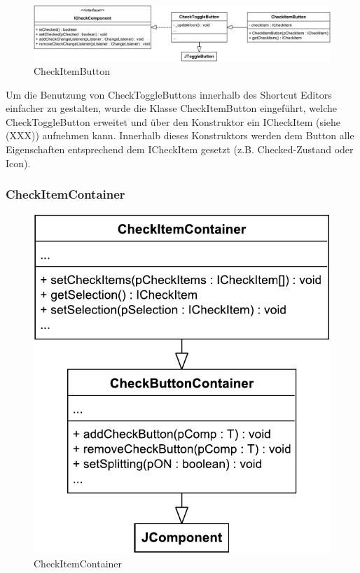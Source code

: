\begin{figure}[H]
	\centering
	\includegraphics[width=1\linewidth]{../graphic/diagrams/CD_CheckButton/CD_CheckButton}
	\caption{CheckItemButton}
	\label{fig:cdcheckbutton}
\end{figure}

\vspace{-5px}

Um die Benutzung von CheckToggleButtons innerhalb des Shortcut Editors einfacher zu gestalten, wurde die Klasse CheckItemButton eingeführt, welche CheckToggleButton erweitet und über den Konstruktor ein ICheckItem (siehe (XXX)) aufnehmen kann. Innerhalb dieses Konstruktors werden dem Button alle Eigenschaften entsprechend dem ICheckItem gesetzt (z.B. Checked-Zustand oder Icon).

\vspace{-5px}

\subsubsection{CheckItemContainer}

\begin{figure}
	\vspace{-12px}
	\centering
	\includegraphics[width=.95\linewidth]{../graphic/diagrams/CD_CheckItemContainer/CD_CheckItemContainer}
	\caption{CheckItemContainer}
	\label{fig:cdcheckitemcontainer}
\end{figure}

